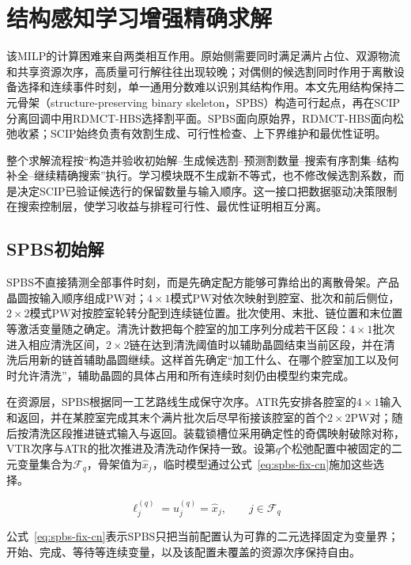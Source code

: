 \documentclass[final,5p,times,twocolumn]{elsarticle}
\newcommand{\method}{RDMCT-HBS}
\begin{document}
\section{结构感知学习增强精确求解}

该MILP的计算困难来自两类相互作用。原始侧需要同时满足满片占位、双源物流和共享资源次序，高质量可行解往往出现较晚；对偶侧的候选割同时作用于离散设备选择和连续事件时刻，单一通用分数难以识别其结构作用。本文先用结构保持二元骨架（structure-preserving binary skeleton，SPBS）构造可行起点，再在SCIP分离回调中用\method{}选择割平面。SPBS面向原始界，\method{}面向松弛收紧；SCIP始终负责有效割生成、可行性检查、上下界维护和最优性证明\citep{achterberg2009scip,bestuzheva2023scip}。

整个求解流程按“构造并验收初始解--生成候选割--预测割数量--搜索有序割集--结构补全--继续精确搜索”执行。学习模块既不生成新不等式，也不修改候选割系数，而是决定SCIP已验证候选行的保留数量与输入顺序。这一接口把数据驱动决策限制在搜索控制层，使学习收益与排程可行性、最优性证明相互分离。

\subsection{SPBS初始解}

SPBS不直接猜测全部事件时刻，而是先确定配方能够可靠给出的离散骨架。产品晶圆按输入顺序组成PW对；$4\times1$模式PW对依次映射到腔室、批次和前后侧位，$2\times2$模式PW对按腔室轮转分配到连续链位置。批次使用、末批、链位置和末位置等激活变量随之确定。清洗计数把每个腔室的加工序列分成若干区段：$4\times1$批次进入相应清洗区间，$2\times2$链在达到清洗阈值时以辅助晶圆结束当前区段，并在清洗后用新的链首辅助晶圆继续。这样首先确定“加工什么、在哪个腔室加工以及何时允许清洗”，辅助晶圆的具体占用和所有连续时刻仍由模型约束完成。

在资源层，SPBS根据同一工艺路线生成保守次序。ATR先安排各腔室的$4\times1$输入和返回，并在某腔室完成其末个满片批次后尽早衔接该腔室的首个$2\times2$PW对；随后按清洗区段推进链式输入与返回。装载锁槽位采用确定性的奇偶映射破除对称，VTR次序与ATR的批次推进及清洗动作保持一致。设第$q$个松弛配置中被固定的二元变量集合为$\mathcal F_q$，骨架值为$\widehat x_j$，临时模型通过公式~\eqref{eq:spbs-fix-cn}施加这些选择。

\begin{equation}
\ell_j^{(q)}=u_j^{(q)}=\widehat x_j,\qquad j\in\mathcal F_q
\label{eq:spbs-fix-cn}
\end{equation}

公式~\eqref{eq:spbs-fix-cn}表示SPBS只把当前配置认为可靠的二元选择固定为变量界；开始、完成、等待等连续变量，以及该配置未覆盖的资源次序保持自由。
\end{document}
